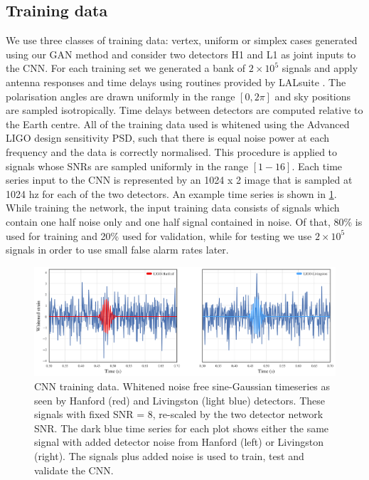 \documentclass[12pt]{iopart}
\begin{document}
\subsection{Training data} 
We use three classes of training data: vertex, uniform or simplex cases generated using our \ac{GAN} method and consider two detectors H1 and L1 as joint inputs to the \ac{CNN}. For each training set we generated a bank of $2\times 10^5$ signals and apply antenna responses and time delays using routines provided by LALsuite \cite{lalsuite}. The polarisation angles are drawn uniformly in the range $[0,2\pi]$ and sky positions are sampled isotropically. Time delays between detectors are computed relative to the Earth centre. All of the training data used is whitened using the Advanced LIGO
design sensitivity \ac{PSD}, such that there is equal noise power at each
frequency and the data is correctly normalised. This procedure is
applied to signals whose \acp{SNR} are sampled uniformly in the range $[1-16]$. Each time series input to the \ac{CNN} is represented by an 1024 x 2 image that is sampled at 1024 hz for each of the two detectors. An example time series is shown in \cref{fig:cnn_training}. While training the network, the input training data consists of
signals which contain one half noise only and one half signal contained in
noise. Of that, 80\% is used for training and 20\% used for validation, while for testing we use $2\times 10^5$ signals in order to use small false alarm rates later.

\begin{figure}[ht!]
    \centering
    \includegraphics[width=\textwidth]{figures/SNR8.png}
    \caption{\ac{CNN} training data. Whitened noise free sine-Gaussian timeseries as seen by Hanford (red) and Livingston (light blue) detectors. These signals with fixed SNR = 8, re-scaled by the two detector network SNR. The dark blue time series for each plot shows either the same signal with added detector noise from Hanford (left) or Livingston (right). The signals plus added noise is used to train, test and validate the \ac{CNN}.}
     \label{fig:cnn_training}
\end{figure}
\end{document}
